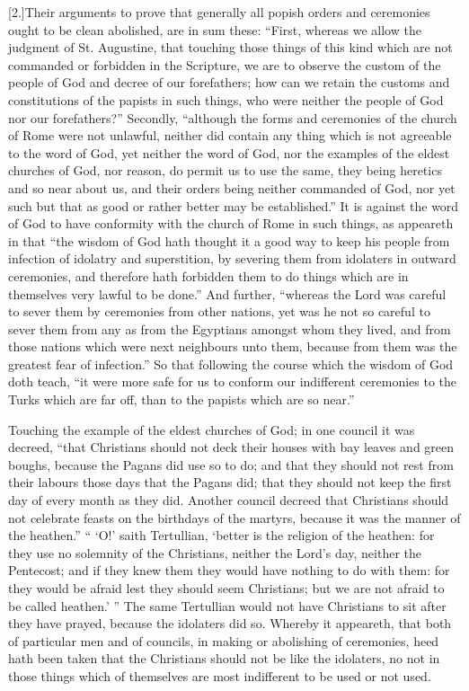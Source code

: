 [2.]Their arguments to prove that generally all popish orders and ceremonies ought to be clean abolished, are in sum these: “First, whereas we allow the judgment of St. Augustine, that touching those things of this kind which are not commanded or forbidden in the Scripture, we are to observe the custom of the people of God and decree of our forefathers; how can we retain the customs and constitutions of the papists in such things, who were neither the people of God nor our forefathers?” Secondly, “although the forms and ceremonies of the church of Rome were not unlawful, neither did contain any thing which is not agreeable to the word of God, yet neither the word of God, nor the examples of the eldest churches of God, nor reason, do permit us to use the same, they being heretics  and so near about us, and their orders being neither commanded of God, nor yet such but that as good or rather better may be established.” It is against the word of God to have conformity with the church of Rome in such things, as appeareth in that “the wisdom of God hath thought it a good way to keep his people from infection of idolatry and superstition, by severing them from idolaters in outward ceremonies, and therefore hath forbidden them to do things which are in themselves very lawful to be done.” And further, “whereas the Lord was careful to sever them by ceremonies from other nations, yet was he not so careful to sever them from any as from the Egyptians amongst whom they lived, and from those nations which were next neighbours unto them, because from them was the greatest fear of infection.” So that following the course which the wisdom of God doth teach, “it were more safe for us to conform our indifferent ceremonies to the Turks which are far off, than to the papists which are so near.”

Touching the example of the eldest churches of God; in one council it was decreed, “that Christians should not deck their houses with bay leaves and green boughs, because the Pagans did use so to do; and that they should not rest from their labours those days that the Pagans did; that they should not keep the first day of every month as they did. Another council decreed that Christians should not  celebrate feasts on the birthdays of the martyrs, because it was the manner of the heathen.” “ ‘O!’ saith Tertullian, ‘better is the religion of the heathen: for they use no solemnity of the Christians, neither the Lord’s day, neither the Pentecost; and if they knew them they would have nothing to do with them: for they would be afraid lest they should seem Christians; but we are not afraid to be called heathen.’ ” The same Tertullian would not have Christians to sit after they have prayed, because the idolaters did so. Whereby it appeareth, that both of particular men and of councils, in making or abolishing of ceremonies, heed hath been taken that the Christians should not be like the idolaters, no not in those things which of themselves are most indifferent to be used or not used.


